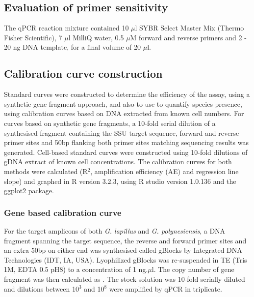 \documentclass[12pt]{article}
\begin{document}
\subsection*{Evaluation of primer sensitivity}
The qPCR reaction mixture contained 10 $\mu$l SYBR Select Master Mix (Thermo Fisher Scientific), 7 $\mu$l MilliQ water, 0.5 $\mu$M forward and reverse primers and 2 - 20 ng DNA template, for a final volume of 20 $\mu$l.
\subsection*{Calibration curve construction}
Standard curves were constructed to determine the efficiency of the assay, using a synthetic gene fragment approach, and also to use to quantify species presence, using calibration curves based on DNA extracted from known cell numbers. For curves based on synthetic gene fragments, a 10-fold serial dilution of a synthesised fragment containing the SSU target sequence, forward and reverse primer sites and 50bp flanking both primer sites matching sequencing results was generated. Cell-based standard curves were constructed using 10-fold dilutions of gDNA extract of known cell concentrations.
The calibration curves for both methods were calculated (R$^{2}$, amplification efficiency (AE) and regression line slope) and graphed in R version 3.2.3, using R studio version 1.0.136 and the ggplot2 package. 
\subsubsection*{Gene based calibration curve}
For the target amplicons of both \emph{G. lapillus} and \emph{G. polynesiensis}, a DNA fragment spanning the target sequence, the reverse and forward primer sites and an extra 50bp on either end was synthesised called gBlocks \textsuperscript{\textregistered} by Integrated DNA Technologies (IDT, IA, USA). Lyophilized gBlocks \textsuperscript{\textregistered} was re-suspended in TE (Tris 1M, EDTA 0.5 pH8) to a concentration of 1 ng.$\mu$l. The copy number of gene fragment was then {\Large calculated as }.
The stock solution was 10-fold serially diluted and dilutions between 10$^{3}$ and 10$^{8}$ were amplified by qPCR in triplicate.


\end{document}
